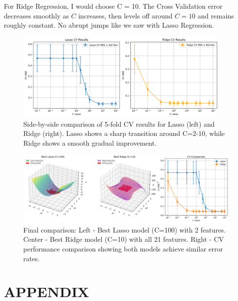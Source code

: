 \documentclass[11pt,a4paper]{article}
\begin{document}
For Ridge Regression, I would choose C = 10. The Cross Validation error decreases smoothly as $C$ increases, then levels off around $C=10$ and remains roughly constant. No abrupt jumps like we saw with Lasso Regression.

\begin{figure}[H]
\centering
\includegraphics[width=0.95\textwidth]{figures/07_lasso_ridge_cv_comparison.png}
\caption{Side-by-side comparison of 5-fold CV results for Lasso (left) and Ridge (right). Lasso shows a sharp transition around C=2-10, while Ridge shows a smooth gradual improvement.}
\label{fig:cv_comparison}
\end{figure}

\begin{figure}[H]
\centering
\includegraphics[width=\textwidth]{figures/08_final_comparison.png}
\caption{Final comparison: Left - Best Lasso model (C=100) with 2 features. Center - Best Ridge model (C=10) with all 21 features. Right - CV performance comparison showing both models achieve similar error rates.}
\label{fig:final_comparison}
\end{figure}

\section*{APPENDIX}
\end{document}
